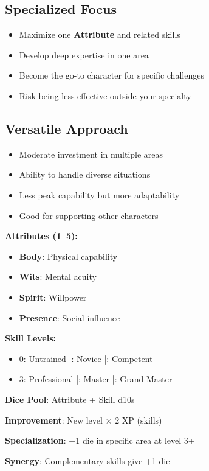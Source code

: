 \subsection*{Specialized Focus}
\begin{itemize}
\item Maximize one \textbf{Attribute} and related skills
\item Develop deep expertise in one area
\item Become the go-to character for specific challenges
\item Risk being less effective outside your specialty
\end{itemize}

\subsection*{Versatile Approach}
\begin{itemize}
\item Moderate investment in multiple areas
\item Ability to handle diverse situations
\item Less peak capability but more adaptability
\item Good for supporting other characters
\end{itemize}

\begin{tcolorbox}[colback=blue!5!white,colframe=blue!75!black,title=Attributes and Skills Quick Reference,fonttitle=\bfseries]
\textbf{Attributes (1--5):}
\begin{itemize}
\item \textbf{Body}: Physical capability
\item \textbf{Wits}: Mental acuity
\item \textbf{Spirit}: Willpower
\item \textbf{Presence}: Social influence
\end{itemize}

\textbf{Skill Levels:}
\begin{itemize}
\item 0: Untrained \;|: Novice \;|: Competent
\item 3: Professional \;|: Master \;|: Grand Master
\end{itemize}

\textbf{Dice Pool}: Attribute + Skill d10s

\textbf{Improvement}: New level $\times$ 2 XP (skills)

\textbf{Specialization}: +1 die in specific area at level 3+

\textbf{Synergy}: Complementary skills give +1 die
\end{tcolorbox}

